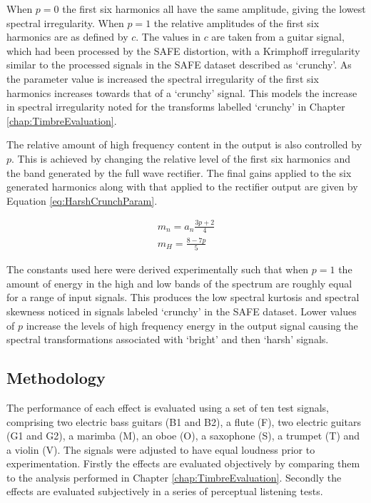 			When $p = 0$ the first six harmonics all have the same amplitude, giving the lowest spectral
			irregularity. When $p = 1$ the relative amplitudes of the first six harmonics are as defined by
			$c$.  The values in $c$ are taken from a guitar signal, which had been processed by the SAFE
			distortion, with a Krimphoff irregularity similar to the processed signals in the SAFE dataset
			described as `crunchy'. As the parameter value is increased the spectral irregularity of the first
			six harmonics increases towards that of a `crunchy' signal. This models the increase in spectral
			irregularity noted for the transforms labelled `crunchy' in Chapter \ref{chap:TimbreEvaluation}.
			
			The relative amount of high frequency content in the output is also controlled by $p$. This is
			achieved by changing the relative level of the first six harmonics and the band generated by the
			full wave rectifier. The final gains applied to the six generated harmonics along with that applied
			to the rectifier output are given by Equation \ref{eq:HarshCrunchParam}.

			\begin{gather}
				m_{n} = a_{n}\frac{3p + 2}{4} \nonumber \\
				m_{H} = \frac{8 - 7p}{5}
				\label{eq:HarshCrunchParam}
			\end{gather}

			The constants used here were derived experimentally such that when $p = 1$ the amount of energy in
			the high and low bands of the spectrum are roughly equal for a range of input signals. This
			produces the low spectral kurtosis and spectral skewness noticed in signals labeled `crunchy' in
			the SAFE dataset. Lower values of $p$ increase the levels of high frequency energy in the output
			signal causing the spectral transformations associated with `bright' and then `harsh' signals.

	\subsection{Methodology}
	\label{sec:PerceptualExperiments-SemanticControl-Methodology}
		The performance of each effect is evaluated using a set of ten test signals, comprising two electric bass
		guitars (B1 and B2), a flute (F), two electric guitars (G1 and G2), a marimba (M), an oboe (O), a saxophone
		(S), a trumpet (T) and a violin (V). The signals were adjusted to have equal loudness prior to
		experimentation.  Firstly the effects are evaluated objectively by comparing them to the analysis performed
		in Chapter \ref{chap:TimbreEvaluation}. Secondly the effects are evaluated subjectively in a series of
		perceptual listening tests.


